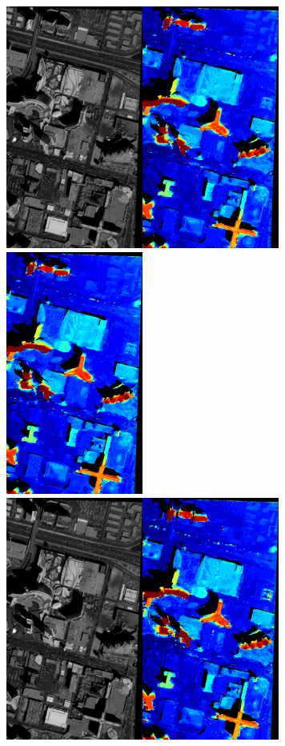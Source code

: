 \documentclass{article}
\theoremstyle{definition}
\begin{document}
\begin{figure}[ht]
 \centering
 \includegraphics[height=8cm]{images/SkysatLR18_120/1521739947374_dmap_050.png}\hspace{-0.28em}
 \includegraphics[height=8cm]{images/SkysatLR18_240/1521741442733_dmap_050.png}\\
 \vspace{-0.11em}
 \includegraphics[height=8cm]{images/SkysatLR18_120/1521739947374_dmap_025.png}\hspace{-0.28em}

\end{figure}
\end{document}
